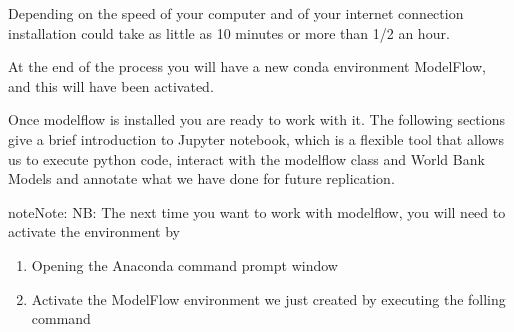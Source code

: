 \documentclass[letterpaper,10pt,english]{jupyterBook}
\begin{document}
\begin{sphinxVerbatim}[commandchars=\\\{\}]
          
  
  
     
    
   
   
   

\end{sphinxVerbatim}

\sphinxAtStartPar
Depending on the speed of your computer and of your internet connection installation could take as little as 10 minutes or more than 1/2 an hour.

\sphinxAtStartPar
At the end of the process you will have a new conda environment ModelFlow, and this will have been activated.

\sphinxAtStartPar
Once modelflow is installed you are ready to work with it.  The following sections give a brief introduction to Jupyter notebook, which is a flexible tool that allows us to execute python code, interact with the modelflow class and World Bank Models and annotate what we have done for future replication.

\begin{sphinxadmonition}{note}{Note:}
\sphinxAtStartPar
NB: The next time you want to work with modelflow, you will need to activate the  environment by
\begin{enumerate}
%
\item {} 
\sphinxAtStartPar
Opening the Anaconda command prompt window

\item {} 
\sphinxAtStartPar
Activate the ModelFlow environment we just created by executing the folling command

\end{enumerate}

\sphinxAtStartPar
{}
\end{sphinxadmonition}
\end{document}
